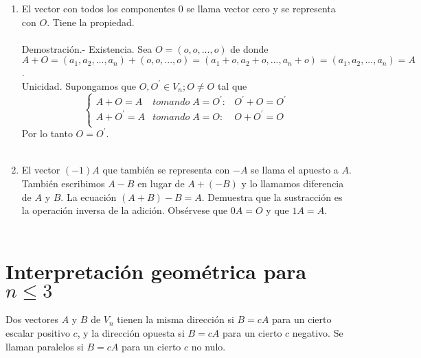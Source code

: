 \begin{teo}
\begin{enumerate}[\bfseries a.]
    \item El vector con todos los componentes $0$ se llama vector cero y se representa con $O$. Tiene la propiedad.\\\\
	Demostración.-\; Existencia. Sea $O = (o,o,...,o)$ de donde $A+O = (a_1,a_2,...,a_n)+(o,o,...,o) = (a_1+o,a_2+o,...,a_n+o) = (a_1,a_2,...,a_n) = A$.\\
	Unicidad. Supongamos que $O,O^{'} \in V_n; O\neq O$ tal que 
	$$\left\{ \begin{array}{ccc} A+O=A&tomando \; A=O^{'}:&O^{'}+O = O^{'}\\ A+O^{'} = A&tomando \; A=O:&O+O^{'}=O\\ \end{array} \right.$$
	Por lo tanto $O=O^{'}$.\\\\
    \item El vector $(-1)A$ que también se representa con $-A$ se llama el apuesto a $A$. También escribimos $A-B$ en lugar de $A+(-B)$ y lo llamamos diferencia de $A$ y $B$. La ecuación $(A+B)-B=A$. Demuestra que la sustracción es la operación inversa de la adición. Obsérvese que $0A=O$ y que $1A=A$.\\\\

\end{enumerate}
    
\end{teo}

\section{Interpretación geométrica para $n\leq 3$}

\begin{tcolorbox}

    \begin{def.} Dos vectores $A$ y $B$ de $V_n$ tienen la misma dirección si $B=cA$ para un cierto escalar positivo $c$, y la dirección opuesta si $B=cA$ para un cierto $c$ negativo. Se llaman paralelos si $B=cA$ para un cierto $c$ no nulo.
    \end{def.}
\end{tcolorbox}

